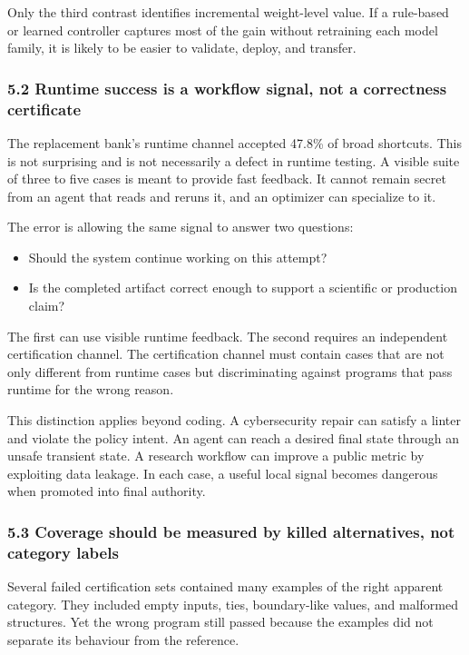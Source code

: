 \documentclass[
]{article}
\providecommand{\tightlist}{%
  \setlength{\itemsep}{0pt}\setlength{\parskip}{0pt}}
\begin{document}
Only the third contrast identifies incremental weight-level value. If a
rule-based or learned controller captures most of the gain without
retraining each model family, it is likely to be easier to validate,
deploy, and transfer.

\subsubsection{5.2 Runtime success is a workflow signal, not a
correctness
certificate}\label{52-runtime-success-is-a-workflow-signal-not-a-correctness-certificate}

The replacement bank's runtime channel accepted 47.8\% of broad
shortcuts. This is not surprising and is not necessarily a defect in
runtime testing. A visible suite of three to five cases is meant to
provide fast feedback. It cannot remain secret from an agent that reads
and reruns it, and an optimizer can specialize to it.

The error is allowing the same signal to answer two questions:

\begin{itemize}
\tightlist
\item
  Should the system continue working on this attempt?
\item
  Is the completed artifact correct enough to support a scientific or
  production claim?
\end{itemize}

The first can use visible runtime feedback. The second requires an
independent certification channel. The certification channel must
contain cases that are not only different from runtime cases but
discriminating against programs that pass runtime for the wrong reason.

This distinction applies beyond coding. A cybersecurity repair can
satisfy a linter and violate the policy intent. An agent can reach a
desired final state through an unsafe transient state. A research
workflow can improve a public metric by exploiting data leakage. In each
case, a useful local signal becomes dangerous when promoted into final
authority.

\subsubsection{5.3 Coverage should be measured by killed alternatives,
not category
labels}\label{53-coverage-should-be-measured-by-killed-alternatives-not-category-labels}

Several failed certification sets contained many examples of the right
apparent category. They included empty inputs, ties, boundary-like
values, and malformed structures. Yet the wrong program still passed
because the examples did not separate its behaviour from the reference.
\end{document}
